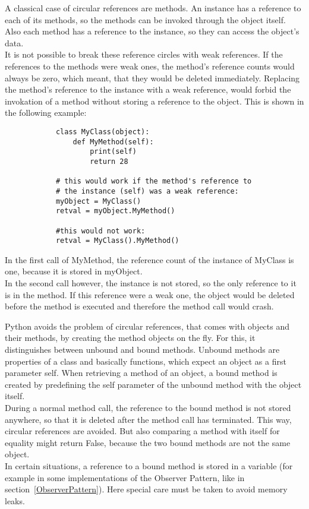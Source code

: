 		A classical case of circular references are methods.
		An instance has a reference to each of its methods, so the methods can be invoked through the object itself.
		Also each method has a reference to the instance, so they can access the object's data.\\
		It is not possible to break these reference circles with weak references.
		If the references to the methods were weak ones, the method's reference counts would always be zero, which meant, that they would be deleted immediately.
		Replacing the method's reference to the instance with a weak reference, would forbid the invokation of a method without storing a reference to the object.
		This is shown in the following example:
		\begin{verbatim}
			class MyClass(object):
				def MyMethod(self):
					print(self)
					return 28

			# this would work if the method's reference to
			# the instance (self) was a weak reference:
			myObject = MyClass()
			retval = myObject.MyMethod()

			#this would not work:
			retval = MyClass().MyMethod()
		\end{verbatim}
		In the first call of {\normalfont \ttfamily MyMethod}, the reference count of the instance of {\normalfont \ttfamily MyClass} is one, because it is stored in {\normalfont \ttfamily myObject}.\\
		In the second call however, the instance is not stored, so the only reference to it is in the method.
		If this reference were a weak one, the object would be deleted before the method is executed and therefore the method call would crash.

		Python avoids the problem of circular references, that comes with objects and their methods, by creating the method objects on the fly.
		For this, it distinguishes between unbound and bound methods.
		Unbound methods are properties of a class and basically functions, which expect an object as a first parameter {\normalfont \ttfamily self}.
		When retrieving a method of an object, a bound method is created by predefining the {\normalfont \ttfamily self} parameter of the unbound method with the object itself.\\
		During a normal method call, the reference to the bound method is not stored anywhere, so that it is deleted after the method call has terminated.
		This way, circular references are avoided.
		But also comparing a method with itself for equality might return {\normalfont \ttfamily False}, because the two bound methods are not the same object.\\
		In certain situations, a reference to a bound method is stored in a variable (for example in some implementations of the Observer Pattern, like in section~\ref{ObserverPattern}).
		Here special care must be taken to avoid memory leaks.



